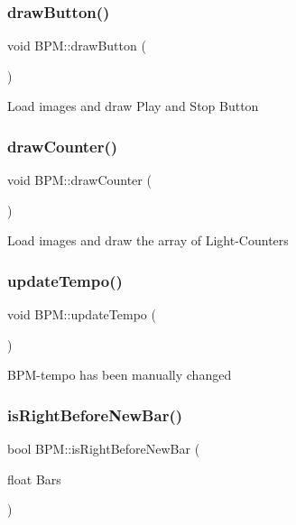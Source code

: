 \subsubsection{\texorpdfstring{drawButton()}{drawButton()}}
{\footnotesize\ttfamily void B\+P\+M\+::draw\+Button (\begin{DoxyParamCaption}{ }\end{DoxyParamCaption})}

Load images and draw Play and Stop Button \mbox{\label{class_b_p_m_a35ccc9fc77a337ed4e3b4bbc063d38ca}} 
\subsubsection{\texorpdfstring{drawCounter()}{drawCounter()}}
{\footnotesize\ttfamily void B\+P\+M\+::draw\+Counter (\begin{DoxyParamCaption}{ }\end{DoxyParamCaption})}

Load images and draw the array of Light-\/\+Counters \mbox{\label{class_b_p_m_a6970a36d44a2fcee62cd0b995a0fa88b}} 
\subsubsection{\texorpdfstring{updateTempo()}{updateTempo()}}
{\footnotesize\ttfamily void B\+P\+M\+::update\+Tempo (\begin{DoxyParamCaption}{ }\end{DoxyParamCaption})}

B\+P\+M-\/tempo has been manually changed \mbox{\label{class_b_p_m_a541ef2ea993f469bbdcbdb5336353fd0}} 
\subsubsection{\texorpdfstring{isRightBeforeNewBar()}{isRightBeforeNewBar()}}
{\footnotesize\ttfamily bool B\+P\+M\+::is\+Right\+Before\+New\+Bar (\begin{DoxyParamCaption}\item[{float}]{Bars }\end{DoxyParamCaption})}

